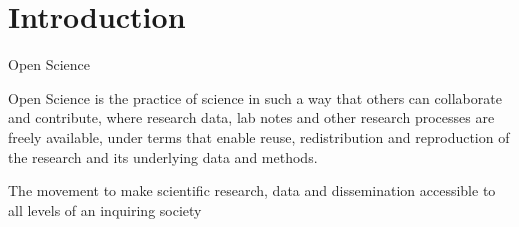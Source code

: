 \chapter{Introduction}

\label{introduction}


Open Science 

Open Science is the practice of science in such a way that others can collaborate and contribute, where research data, lab notes and other research processes are freely available, under terms that enable reuse, redistribution and reproduction of the research and its underlying data and methods.

The movement to make scientific research, data and dissemination accessible to all levels of an inquiring society

\begin{figure}[ht]
  \centering

\end{figure}
